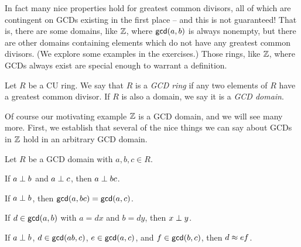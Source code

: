 In fact many nice properties hold for greatest common divisors, all of which are contingent on GCDs existing in the first place -- and this is not guaranteed!
That is, there are some domains, like \(\mathbb{Z}\), where \(\mathsf{gcd}(a, b)\) is always nonempty, but there are other domains containing elements which do not have any greatest common divisors.
(We explore some examples in the exercises.)
Those rings, like \(\mathbb{Z}\), where GCDs always exist are special enough to warrant a definition.

\begin{dfn} \label{dfn:gcd-ring}
Let \(R\) be a CU ring.
We say that \(R\) is a \emph{GCD ring} if any two elements of \(R\) have a greatest common divisor.
If \(R\) is also a domain, we say it is a \emph{GCD domain}.
\end{dfn}

Of course our motivating example \(\mathbb{Z}\) is a GCD domain, and we will see many more.
First, we establish that several of the nice things we can say about GCDs in \(\mathbb{Z}\) hold in an arbitrary GCD domain.

\begin{prop} \label{prop:gcd-dom-basics}
Let \(R\) be a GCD domain with \(a,b,c \in R\).
\begin{proplist*}
\item If \(a \perp b\) and \(a \perp c\), then \(a \perp bc\).
\item \label{prop:gcd-dom-basics:drop-factor} If \(a \perp b\), then \(\mathsf{gcd}(a, bc) = \mathsf{gcd}(a, c)\).
\item If \(d \in \mathsf{gcd}(a, b)\) with \(a = dx\) and \(b = dy\), then \(x \perp y\).
\item If \(a \perp b\), \(d \in \mathsf{gcd}(ab, c)\), \(e \in \mathsf{gcd}(a, c)\), and \(f \in \mathsf{gcd}(b, c)\), then \(d \approx ef\).
\end{proplist*}
\end{prop}

